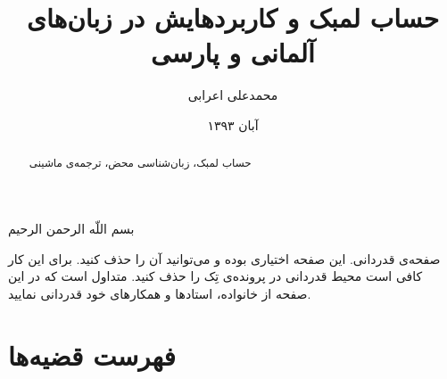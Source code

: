 \documentclass[MScThesis,twoside]{lambek}
\date{آبان ۱۳۹۳}
\title{حساب لمبک و کاربردهایش در زبان‌های آلمانی و پارسی}
\author{محمدعلی اعرابی}
\newcommand{\faKeywords}{حساب لمبک،
زبان‌شناسی محض،
ترجمه‌ی ماشینی}
\begin{document}
\newcommand{\StartDocument}{\frontmatter \baselineskip1.2\baselineskip \pagestyle{empty} \null \vfill
\begin{center}
\Large{بسم اللّه الرحمن الرحیم}
\end{center}
\vfill}

\makethesistitle
\StartDocument

\pagestyle{pagenumberonlyPagestyle}
\begin{تصویب}
\end{تصویب}
\newpage

\dedication{\large پیش‌کش به روان ژواخیم لمبک\\و میرشمس‌الدین ادیب‌سلطانی} 

\setlength{\baselineskip}{0.9cm}

\begin{قدردانی}
صفحه‌ی قدردانی. این صفحه اختیاری بوده و می‌توانید آن را حذف کنید. برای این کار کافی است محیط قدردانی در پرونده‌ی تِک را حذف کنید. متداول است که در این صفحه از خانواده، استادها و همکارهای خود قدردانی نمایید.
\end{قدردانی}

\begin{abstract}{\faKeywords}

\end{abstract}


\setlength{\baselineskip}{0.9cm}
\tableofcontents\listoftables\listoffigures

\mainmatter


\appendix

\chapter{فهرست قضیه‌ها}
\end{document}
